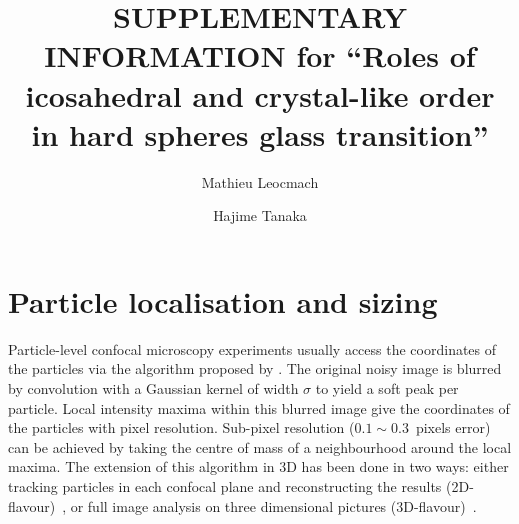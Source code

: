 \documentclass[prl,twocolumn,notitlepage]{revtex4-1}
\begin{document}
\title{SUPPLEMENTARY INFORMATION for ``Roles of icosahedral and crystal-like order \\ in hard spheres glass transition''} 


\author{Mathieu Leocmach} 

\author{Hajime Tanaka}


\maketitle

\section*{Particle localisation and sizing}

Particle-level confocal microscopy experiments usually access the coordinates of the particles via the algorithm proposed by \citet{Crocker1996}. The original noisy image is blurred by convolution with a Gaussian kernel of width $\sigma$ to yield a soft peak per particle. Local intensity maxima within this blurred image give the coordinates of the particles with pixel resolution. Sub-pixel resolution ($0.1\sim0.3$~pixels error) can be achieved by taking the centre of mass of a neighbourhood around the local maxima. The extension of this algorithm in 3D has been done in two ways: either tracking particles in each confocal plane and reconstructing the results (2D-flavour)~\citep{dinsmore2001tdc}, or full image analysis on three dimensional pictures (3D-flavour)~\citep{vanblaaderen1995rss, Lu2007}.
\end{document}
